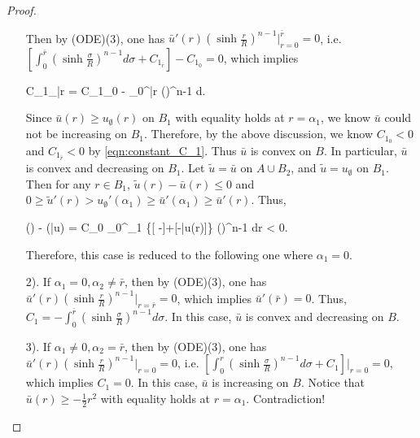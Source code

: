 \begin{proof}
\begin{itemize}
		Then by (ODE)(3), one has $\bar{u}'(r)(\sinh\frac{r}{R})^{n-1}|_{r=0}^{\bar{r}} =0$, i.e. $[\int_{0}^{\bar{r}} (\sinh\frac{\sigma }{R})^{n-1} d\sigma  +C_{1_{\bar{r}}}] - C_{1_0} =0$, which implies 
		\begin{flalign}\label{eqn:constant_C_1}
			C_{1_{\bar{r}}} = C_{1_0} -  \int_{0}^{\bar{r}} (\sinh{})^{n-1} d\sigma .
		\end{flalign}
		Since $\bar{u}(r) \ge u_{\emptyset} (r)$ on $B_1$ with equality holds at $r= \alpha_1$, we know $\bar{u}$ could not be increasing on $B_1$. Therefore, by the above discussion, we know $C_{1_0} <0$ and $C_{1_{\bar{r}}}<0$ by \eqref{eqn:constant_C_1}. Thus $\bar{u}$ is convex on $B$. In particular,  $\bar{u}$ is convex and decreasing on $B_1$. Let $\tilde{u} = \bar{u}$ on $A \cup B_2$, and $\tilde{u} = u_{\emptyset}$ on $B_1$. Then for any $r\in B_1$, $\tilde{u}(r) - \bar{u}(r) \le 0$ and $0\ge  \tilde{u}'(r)> u_{\emptyset}'(\alpha_1) \ge \bar{u}'(\alpha_1) \ge \bar{u}'(r) $. Thus,
		\begin{flalign}
			() - (\bar{u}) = C_0 \int_{0}^{\alpha_1} \Big\{[ -]+[-\bar{u}(r)]\Big\} (\sinh{})^{n-1} dr < 0.
		\end{flalign}
		Therefore, this case is reduced to the following one where $\alpha_1 =0$.
	
		\item[2).] 	If $\alpha_1=0, \alpha_2\neq\bar{r}$, then by (ODE)(3), one has $\bar{u}'(r)(\sinh\frac{r}{R})^{n-1}|_{r=\bar{r}} =0$, which implies $\bar{u}'(\bar{r}) =0$. Thus, $C_1 = -\int_{0}^{\bar{r}} (\sinh\frac{\sigma }{R})^{n-1} d\sigma $. In this case, $\bar{u}$ is convex and decreasing on $B$.
		
		\item [3).] If $\alpha_1\neq0,\alpha_2=\bar{r}$, then by (ODE)(3), one has $\bar{u}'(r)(\sinh\frac{r}{R})^{n-1}|_{r=0} =0$, i.e. $[\int_{0}^{r} (\sinh\frac{\sigma }{R})^{n-1} d\sigma  +C_1]|_{r=0} =0$, which implies $C_1 = 0$. In this case, $\bar{u}$ is increasing on $B$. Notice that $\bar{u}(r)\ge -\frac{1}{2} r^2$ with equality holds at $r=\alpha_1$. Contradiction!
	\end{itemize}


\end{proof}
